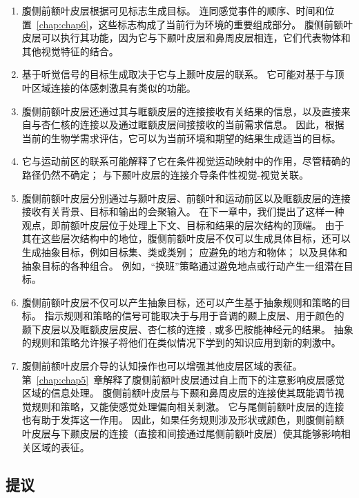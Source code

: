 \begin{enumerate}
\item 腹侧前额叶皮层根据可见标志生成目标。 
连同感觉事件的顺序、时间和位置~\ref{chap:chap6}，这些标志构成了当前行为环境的重要组成部分。
腹侧前额叶皮层可以执行其功能，因为它与下颞叶皮层和鼻周皮层相连，它们代表物体和其他视觉特征的结合。
\item 基于听觉信号的目标生成取决于它与上颞叶皮层的联系。
它可能对基于与顶叶区域连接的体感刺激具有类似的功能。
\item 腹侧前额叶皮层还通过其与眶额皮层的连接接收有关结果的信息，以及直接来自与杏仁核的连接以及通过眶额皮层间接接收的当前需求信息。
因此，根据当前的生物学需求评估，它可以为当前环境和期望的结果生成适当的目标。
\item 它与运动前区的联系可能解释了它在条件视觉运动映射中的作用，尽管精确的路径仍然不确定； 与下颞叶皮层的连接介导条件性视觉-视觉关联。
\item 腹侧前额叶皮层分别通过与颞叶皮层、前额叶和运动前区以及眶额皮层的连接接收有关背景、目标和输出的会聚输入。
在下一章中，我们提出了这样一种观点，即前额叶皮层位于处理上下文、目标和结果的层次结构的顶端。
由于其在这些层次结构中的地位，腹侧前额叶皮层不仅可以生成具体目标，还可以生成抽象目标，例如目标集、类或类别； 应避免的地方和物体； 以及具体和抽象目标的各种组合。
例如，“换班”策略通过避免地点或行动产生一组潜在目标。
\item 腹侧前额叶皮层不仅可以产生抽象目标，还可以产生基于抽象规则和策略的目标。 
指示规则和策略的信号可能取决于与用于音调的颞上皮层\cite{wallis2001single}、用于颜色的颞下皮层\cite{tsujimoto2010evaluating}以及眶额皮层皮层、杏仁核的连接 , 或多巴胺能神经元的结果。
抽象的规则和策略允许猴子将他们在类似情况下学到的知识应用到新的刺激中。
\item 腹侧前额叶皮层介导的认知操作也可以增强其他皮层区域的表征。
第~\ref{chap:chap5}~章解释了腹侧前额叶皮层通过自上而下的注意影响皮层感觉区域的信息处理。
腹侧前额叶皮层与下颞和鼻周皮层的连接使其既能调节视觉规则和策略，又能使感觉处理偏向相关刺激。
它与尾侧前额叶皮层的连接也有助于发挥这一作用。
因此，如果任务规则涉及形状或颜色，则腹侧前额叶皮层与下颞皮层的连接（直接和间接通过尾侧前额叶皮层）使其能够影响相关区域的表征。
\end{enumerate}




\subsection{提议}
\par


